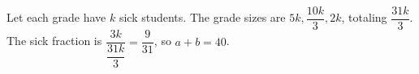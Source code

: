 Let each grade have $k$ sick students. The grade sizes are $5k,\dfrac{10k}{3},2k$, totaling $\dfrac{31k}{3}$. The sick fraction is $\dfrac{3k}{\dfrac{31k}{3}}=\dfrac{9}{31}$, so $\boxed{a+b=40}$.
